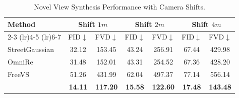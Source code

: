 \begin{table}[tb!]
    \centering
    \caption{Motion Cues in Generated Videos}
    \label{tab:motion}
    \vspace{-10pt}
\end{table}



\begin{table}[htb]
    \centering
    \caption{Novel View Synthesis Performance with Camera Shifts.}
    \label{tab:nvs}
    \vspace{-10pt}
    \begin{tabular}{l|cc|cc|cc}
        \toprule
        \multirow{3}{*}{Method} & \multicolumn{2}{c|}{Shift $1m$} & 
        \multicolumn{2}{c|}{Shift $2m$} & \multicolumn{2}{c}{Shift $4m$}\\
        \cmidrule(lr){2-3} \cmidrule(lr){4-5} \cmidrule(lr){6-7}
        & FID$\downarrow$ & FVD$\downarrow$ & FID$\downarrow$ & FVD$\downarrow$ &FID$\downarrow$ &FVD$\downarrow$\\
        \midrule
        StreetGaussian~\cite{yan2024street} & 32.12  & 153.45  &  43.24 & 256.91 & 67.44 & 429.98 \\
        OmniRe~\cite{chen2024omnire}   & 31.48  & 152.01  & 43.31  & 254.52 & 67.36 & 428.20 \\
        FreeVS~\cite{wang2024freevs}   &  51.26  &  431.99  &  62.04  &  497.37  &  77.14  &  556.14 \\
        \midrule
        \ourmethod{} & \textbf{14.11}  & \textbf{117.20} & \textbf{15.58} & \textbf{122.60} & \textbf{17.48} & \textbf{143.48}\\
        \bottomrule
    \end{tabular}
\end{table}

